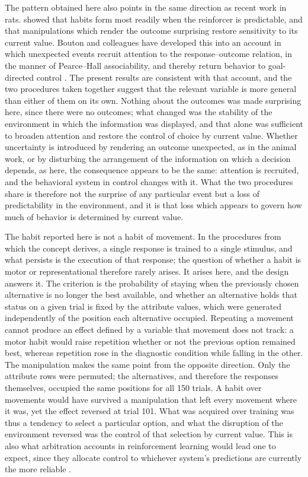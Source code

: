 \documentclass[man,natbib,floatsintext]{apa7}
\begin{document}
The pattern obtained here also points in the same direction as recent work in rats. \citet{thrailkill2018} showed that habits form most readily when the reinforcer is predictable, and that manipulations which render the outcome surprising restore sensitivity to its current value. Bouton and colleagues have developed this into an account in which unexpected events recruit attention to the response--outcome relation, in the manner of Pearce--Hall associability, and thereby return behavior to goal-directed control \citep{bouton2020,bouton2024}. The present results are consistent with that account, and the two procedures taken together suggest that the relevant variable is more general than either of them on its own. Nothing about the outcomes was made surprising here, since there were no outcomes; what changed was the stability of the environment in which the information was displayed, and that alone was sufficient to broaden attention and restore the control of choice by current value. Whether uncertainty is introduced by rendering an outcome unexpected, as in the animal work, or by disturbing the arrangement of the information on which a decision depends, as here, the consequence appears to be the same: attention is recruited, and the behavioral system in control changes with it. What the two procedures share is therefore not the surprise of any particular event but a loss of predictability in the environment, and it is that loss which appears to govern how much of behavior is determined by current value.

The habit reported here is not a habit of movement. In the procedures from which the concept derives, a single response is trained to a single stimulus, and what persists is the execution of that response; the question of whether a habit is motor or representational therefore rarely arises. It arises here, and the design answers it. The criterion is the probability of staying when the previously chosen alternative is no longer the best available, and whether an alternative holds that status on a given trial is fixed by the attribute values, which were generated independently of the position each alternative occupied. Repeating a movement cannot produce an effect defined by a variable that movement does not track: a motor habit would raise repetition whether or not the previous option remained best, whereas repetition rose in the diagnostic condition while falling in the other. The manipulation makes the same point from the opposite direction. Only the attribute rows were permuted; the alternatives, and therefore the responses themselves, occupied the same positions for all 150 trials. A habit over movements would have survived a manipulation that left every movement where it was, yet the effect reversed at trial 101. What was acquired over training was thus a tendency to select a particular option, and what the disruption of the environment reversed was the control of that selection by current value. This is also what arbitration accounts in reinforcement learning would lead one to expect, since they allocate control to whichever system's predictions are currently the more reliable \citep{daw2005,lee2014}. 
\end{document}
